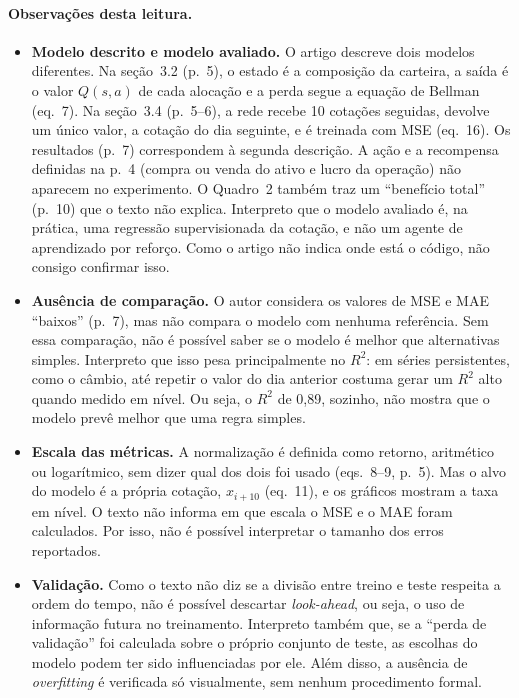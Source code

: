 \paragraph{Observações desta leitura.}
\begin{itemize}
  \item \textbf{Modelo descrito e modelo avaliado.} 
  O artigo descreve dois modelos diferentes. Na seção~3.2 (p.~5), o estado é a composição da carteira, a saída é o valor $Q(s,a)$ de cada alocação e a perda segue a equação de Bellman (eq.~7). Na seção~3.4 (p.~5--6), a rede recebe 10 cotações seguidas, devolve um único valor, a cotação do dia seguinte, e é treinada com MSE (eq.~16). Os resultados (p.~7) correspondem à segunda descrição. A ação e a recompensa definidas na p.~4 (compra ou venda do ativo e lucro da operação) não aparecem no experimento. O Quadro~2 também traz um ``benefício total'' (p.~10) que o texto não explica. Interpreto que o modelo avaliado é, na prática, uma regressão supervisionada da cotação, e não um agente de aprendizado por reforço. Como o artigo não indica onde está o código, não consigo confirmar isso.
  
  \item \textbf{Ausência de comparação.} 
  O autor considera os valores de MSE e MAE ``baixos'' (p.~7), mas não compara o modelo com nenhuma referência. Sem essa comparação, não é possível saber se o modelo é melhor que alternativas simples. Interpreto que isso pesa principalmente no $R^2$: em séries persistentes, como o câmbio, até repetir o valor do dia anterior costuma gerar um $R^2$ alto quando medido em nível. Ou seja, o $R^2$ de 0,89, sozinho, não mostra que o modelo prevê melhor que uma regra simples.

  \item \textbf{Escala das métricas.}  
  A normalização é definida como retorno, aritmético ou logarítmico, sem dizer qual dos dois foi usado (eqs.~8--9, p.~5). Mas o alvo do modelo é a própria cotação, $x_{i+10}$ (eq.~11), e os gráficos mostram a taxa em nível. O texto não informa em que escala o MSE e o MAE foram calculados. Por isso, não é possível interpretar o tamanho dos erros reportados.
  
  \item \textbf{Validação.} 
  Como o texto não diz se a divisão entre treino e teste respeita a ordem do tempo, não é possível descartar \emph{look-ahead}, ou seja, o uso de informação futura no treinamento. Interpreto também que, se a ``perda de validação'' foi calculada sobre o próprio conjunto de teste, as escolhas do modelo podem ter sido influenciadas por ele. Além disso, a ausência de \emph{overfitting} é verificada só visualmente, sem nenhum procedimento formal.
  

\end{itemize}
